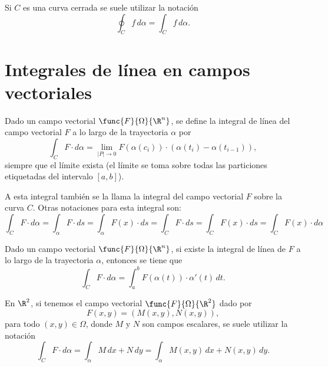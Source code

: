 \documentclass[a4,11pt]{aleph-notas}
\begin{document}
\begin{advertencia}
    Si $C$ es una curva cerrada se suele utilizar la notación
    \[
        \oint_C f \, d\alpha = \int_C f \, d\alpha.
    \]
\end{advertencia}

\section{Integrales de línea en campos vectoriales}

\begin{defi}
    Dado un campo vectorial $\func{F}{\Omega}{\R^n}$, se define la integral de línea del campo vectorial $F$ a lo largo de la trayectoria $\alpha$ por
    \[
        \int_C F \cdot d\alpha
        = \lim_{|P|\to 0} F(\alpha(c_i))\cdot (\alpha(t_i)-\alpha(t_{i-1}) ),
    \]
    siempre que el límite exista (el límite se toma sobre todas las particiones etiquetadas del intervalo $[a,b]$).
\end{defi}

\begin{advertencia}
    A esta integral también se la llama la integral del campo vectorial $F$ sobre la curva $C$. Otras notaciones para esta integral son:
    \[
        \int_C F \cdot d\alpha
        = \int_\alpha F \cdot ds
        = \int_\alpha F(x) \cdot ds
        = \int_C F \cdot ds
        = \int_C F(x) \cdot ds
        = \int_C F(x) \cdot d\alpha
    \]
\end{advertencia}

\begin{teo}
    Dado un campo vectorial $\func{F}{\Omega}{\R^n}$, si existe la integral de línea de $F$ a lo largo de la trayectoria $\alpha$, entonces se tiene que
    \[
        \int_C F \cdot d\alpha
        =\int_a^b F(\alpha(t))\cdot \alpha'(t)\,dt.
    \]
\end{teo}

\begin{advertencia}
    En $\R^2$, si tenemos el campo vectorial $\func{F}{\Omega}{\R^2}$ dado por
    \[
        F(x,y) = (M(x,y),N(x,y)),
    \]
    para todo $(x,y)\in \Omega$, donde $M$ y $N$ son campos escalares, se suele utilizar la notación
    \[
        \int_C F \cdot d\alpha
        = \int_\alpha M\,dx + N\,dy
        = \int_\alpha M(x,y)\,dx + N(x,y)\,dy.
    \]
\end{advertencia}
\end{document}
